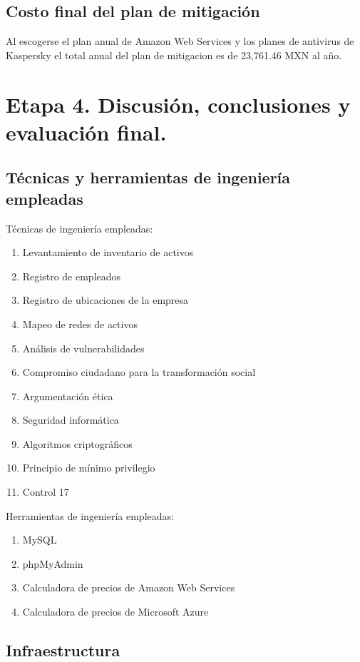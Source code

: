 \documentclass[10pt]{article}
\begin{document}
\subsection{Costo final del plan de mitigación}

Al escogerse el plan anual de Amazon Web Services y los planes de antivirus de Kaspersky el total anual del plan de mitigacion es de 23,761.46 MXN al año.


\section{Etapa 4. Discusión, conclusiones y evaluación final.}

\subsection{Técnicas y herramientas de ingeniería empleadas}

Técnicas de ingeniería empleadas:
\begin{enumerate}
    \item Levantamiento de inventario de activos
    \item Registro de empleados 
    \item Registro de ubicaciones de la empresa
    \item Mapeo de redes de activos 
    \item Análisis de vulnerabilidades
    \item Compromiso ciudadano para la transformación social
    \item Argumentación ética
    \item Seguridad informática
    \item Algoritmos criptográficos
    \item Principio de mínimo privilegio
    \item Control 17
\end{enumerate}
Herramientas de ingeniería empleadas:
\begin{enumerate}
    \item MySQL
    \item phpMyAdmin
    \item Calculadora de precios de Amazon Web Services
    \item Calculadora de precios de Microsoft Azure 
\end{enumerate}

\subsection{Infraestructura}
\end{document}
